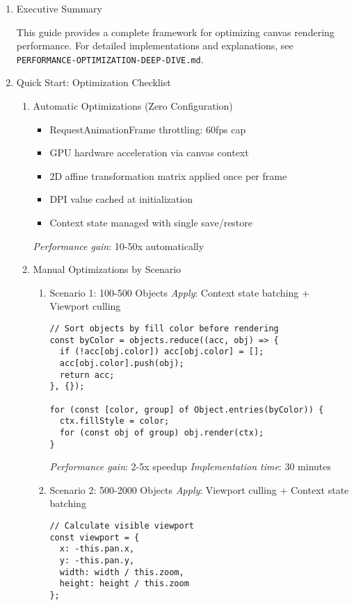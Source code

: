 \documentclass[11pt]{article}
\begin{document}
\begin{enumerate}
\item Executive Summary
\label{sec:orgfbe382c}

This guide provides a complete framework for optimizing canvas rendering performance. For detailed implementations and explanations, see \texttt{PERFORMANCE-OPTIMIZATION-DEEP-DIVE.md}.
\item Quick Start: Optimization Checklist
\label{sec:org9d99f6e}

\begin{enumerate}
\item Automatic Optimizations (Zero Configuration)
\label{sec:org8feafd6}
\begin{itemize}
\item RequestAnimationFrame throttling: 60fps cap
\item GPU hardware acceleration via canvas context
\item 2D affine transformation matrix applied once per frame
\item DPI value cached at initialization
\item Context state managed with single save/restore
\end{itemize}

\emph{Performance gain}: 10-50x automatically
\item Manual Optimizations by Scenario
\label{sec:org73c8e1a}

\begin{enumerate}
\item Scenario 1: 100-500 Objects
\label{sec:org742f797}
\emph{Apply}: Context state batching + Viewport culling
\begin{verbatim}
// Sort objects by fill color before rendering
const byColor = objects.reduce((acc, obj) => {
  if (!acc[obj.color]) acc[obj.color] = [];
  acc[obj.color].push(obj);
  return acc;
}, {});

for (const [color, group] of Object.entries(byColor)) {
  ctx.fillStyle = color;
  for (const obj of group) obj.render(ctx);
}
\end{verbatim}

\emph{Performance gain}: 2-5x speedup
\emph{Implementation time}: 30 minutes
\item Scenario 2: 500-2000 Objects
\label{sec:org3426629}
\emph{Apply}: Viewport culling + Context state batching
\begin{verbatim}
// Calculate visible viewport
const viewport = {
  x: -this.pan.x,
  y: -this.pan.y,
  width: width / this.zoom,
  height: height / this.zoom
};


\end{verbatim}
\end{enumerate}
\end{enumerate}
\end{enumerate}
\end{document}
